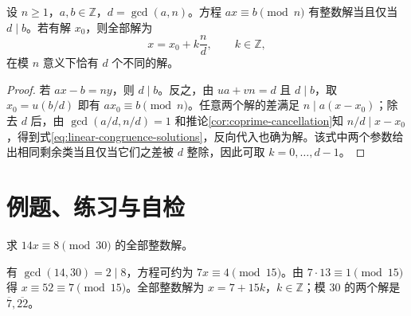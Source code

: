 \documentclass[UTF8,12pt,a4paper,fontset=fandol]{ctexbook}
\begin{document}
\begin{theorem}[线性同余方程]\label{thm:linear-congruence}
设 $n\geq1$，$a,b\in\mathbb Z$，$d=\gcd(a,n)$。方程 $ax\equiv b\pmod n$ 有整数解当且仅当 $d\mid b$。若有解 $x_0$，则全部解为
\begin{equation}\label{eq:linear-congruence-solutions}
  x=x_0+k\frac nd,\qquad k\in\mathbb Z,
\end{equation}
在模 $n$ 意义下恰有 $d$ 个不同的解。
\end{theorem}
\begin{proof}
若 $ax-b=ny$，则 $d\mid b$。反之，由 $ua+vn=d$ 且 $d\mid b$，取 $x_0=u(b/d)$ 即有 $ax_0\equiv b\pmod n$。任意两个解的差满足 $n\mid a(x-x_0)$；除去 $d$ 后，由 $\gcd(a/d,n/d)=1$ 和推论\ref{cor:coprime-cancellation}知 $n/d\mid x-x_0$，得到式\eqref{eq:linear-congruence-solutions}，反向代入也确为解。该式中两个参数给出相同剩余类当且仅当它们之差被 $d$ 整除，因此可取 $k=0,\ldots,d-1$。
\end{proof}

\section{例题、练习与自检}

\begin{example}[求解线性同余]
求 $14x\equiv8\pmod{30}$ 的全部整数解。
\end{example}
\begin{solve}
有 $\gcd(14,30)=2\mid8$，方程可约为 $7x\equiv4\pmod{15}$。由 $7\cdot13\equiv1\pmod{15}$ 得 $x\equiv52\equiv7\pmod{15}$。全部整数解为 $x=7+15k$，$k\in\mathbb Z$；模 $30$ 的两个解是 $\overline7,\overline{22}$。
\end{solve}
\end{document}

